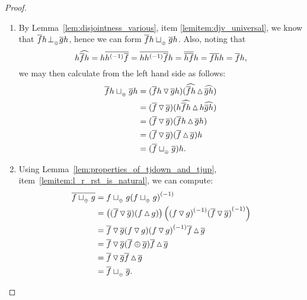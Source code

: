 \begin{proof}
  \prepprooflist
  \begin{enumerate}[{(}i{)}]
    \item By Lemma~\ref{lem:disjointness_various}, item \ref{lemitem:djv_universal}, we know that
    $\rst{f}h \tperp \rst{g} h$, hence we can form $\rst{f}h \tjoin \rst{g}h$.
    Also, noting that
      \[
        h \wrg{\rst{f} h} = h \rst{\inv{h}\rst{f}} = \rst{h \inv{h} \rst{f}} h
          = \rst{\rst{h}\rst{f}} h = \rst{f} \rst{h}h = \rst{f} h,
      \]
      we may then calculate from the left hand side as follows:
      \begin{align*}
        \rst{f}h \tjoin \rst{g}h
          & = (\rst{f}h \tjdown \rst{g} h) (\wrg{\rst{f}h}\tjup\wrg{\rst{g} h})\\
          & = (\rst{f} \tjdown \rst{g} ) (h\wrg{\rst{f}h}\tjup h\wrg{\rst{g} h})\\
          & = (\rst{f} \tjdown \rst{g} ) (\rst{f}h\tjup \rst{g} h)\\
          & = (\rst{f} \tjdown \rst{g} ) (\rst{f}\tjup \rst{g} )h\\
          & = (\rst{f} \tjoin \rst{g} ) h.
      \end{align*}
    \item
    Using Lemma~\ref{lem:properties_of_tjdown_and_tjup}, item~\ref{lemitem:l_r_rst_is_natural},
    we can compute:
    \begin{align*}
      \rst{f\tjoin g} & = f \tjoin g \inv{(f\tjoin g)} \\
      & = \left((\rst{f} \tjdown \rst{g})(f\tjup g)\right)
             \left(\inv{(f\tjdown g)} \inv{(\rst{f}\tjdown \rst{g})}\right)\\
      & = \rst{f}\tjdown\rst{g}(f\tjdown g) \inv{(f\tjdown g)} \rst{f}\tjup \rst{g}\\
      & = \rst{f}\tjdown\rst{g}(\rst{f}\+ \rst{g})\rst{f}\tjup \rst{g}\\
      & = \rst{f}\tjdown\rst{g}\rst{f}\tjup \rst{g}\\
      & = \rst{f}\tjoin\rst{g}.
    \end{align*}
  \end{enumerate}
\end{proof}


